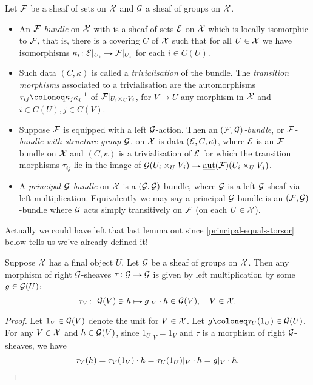 \begin{definition}
  \label{bundle-sheaf}
  Let $\mathcal{F}$ be a sheaf of sets on $\mathcal{X}$ and $\mathcal{G}$ a sheaf of groups on
  $\mathcal{X}$.
  \begin{itemize}
  \item An \emph{$\mathcal{F}$-bundle} on $\mathcal{X}$ with is a sheaf of sets $\mathcal{E}$ on
    $\mathcal{X}$ which is locally isomorphic to $\mathcal{F}$, that is, there is a
    covering $C$ of $\mathcal{X}$ such that for all $U \in \mathcal{X}$ we have
    isomorphisms $\kappa_i \c \E|_{U_i} \to \F|_{U_i}$ for each $i \in
    C(U)$.
  \item Such data $(C,\kappa)$ is called a \emph{trivialisation} of
    the bundle. The \emph{transition morphisms} associated to a
    trivialisation are the automorphisms $\tau_{ij} \ce
    \kappa_j\kappa_i^{-1}$ of $\mathcal{F}|_{U_i \times_U V_j}$, for $V \to U$
    any morphism in $\mathcal{X}$ and $i \in C(U), j \in C(V)$.
  \item Suppose $\mathcal{F}$ is equipped with a left $\mathcal{G}$-action. Then an
    \emph{$(\mathcal{F},\mathcal{G})$-bundle}, or \emph{$\mathcal{F}$-bundle with structure group
      $\mathcal{G}$}, on $\mathcal{X}$ is data $(\mathcal{E},C,\kappa)$, where $\mathcal{E}$ is an
    $\mathcal{F}$-bundle on $\mathcal{X}$ and $(C,\kappa)$ is a trivialisation of $\mathcal{E}$
    for which the transition morphisms $\tau_{ij}$ lie in the image of
    $\G(U_i \times_U V_j) \to \saut(\F)(U_i \times_U V_j)$.
  \item A \emph{principal $\mathcal{G}$-bundle} on $\mathcal{X}$ is a $(\mathcal{G},\mathcal{G})$-bundle,
    where $\mathcal{G}$ is a left $\mathcal{G}$-sheaf via left
    multiplication. Equivalently we may say a principal $\mathcal{G}$-bundle is
    an $(\mathcal{F},\mathcal{G})$-bundle where $\mathcal{G}$ acts simply transitively on $\mathcal{F}$
    (on each $U \in \mathcal{X}$).
  \end{itemize}
\end{definition}

Actually we could have left that last lemma out since
\cref{principal-equals-torsor} below tells us we've already defined
it!

\begin{lemma}
  \label{auto-left}
  Suppose $\mathcal{X}$ has a final object $U$. Let $\mathcal{G}$ be a sheaf of groups
  on $\mathcal{X}$. Then any morphism of right $\mathcal{G}$-sheaves $\tau \c \G \to \G$
  is given by left multiplication by some $g \in \mathcal{G}(U)$:
  \[
  \tau_V \c\ \G(V) \ni h \mapsto g|_V \cdot h \in \G(V), \quad V \in
  \X.
  \]
\end{lemma}

\begin{proof}
  Let $1_V \in \mathcal{G}(V)$ denote the unit for $V \in \mathcal{X}$. Let $g \ce
  \tau_U(1_U) \in \G(U)$. For any $V \in \mathcal{X}$ and $h \in
  \mathcal{G}(V)$, since $1_U|_V = 1_V$ and $\tau$ is a morphism of right
  $\mathcal{G}$-sheaves, we have
  \[
  \tau_V(h) = \tau_V(1_V) \cdot h = \tau_U(1_U)|_V \cdot h = g|_V
  \cdot h. \qedhere
  \]
\end{proof}

